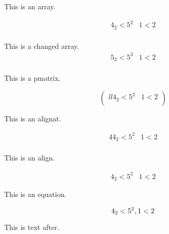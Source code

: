 \documentclass{article}
\begin{document}
This is an array.

\[
\begin{array}{ll}
 4_2  < 5^2 & 1 < 2 \\
\end{array}
\]

This is a changed array.
\[
\begin{array}{ll}
 5_3  < 5^3 & 1 < 2 \\
\end{array}
\]

This is a pmatrix.

\[
\begin{pmatrix}{ll}
 4_2  < 5^2 & 1 < 2 \\
\end{pmatrix}
\]

This is an alignat.

\begin{alignat}{4}
 4_2  < 5^2 & 1 < 2 \\
\end{alignat}

This is an align.


\begin{align}
 4_2  < 5^2 & 1 < 2 
\end{align}

This is an equation.

\begin{equation}
 4_2  < 5^2 , 1 < 2 \\
\end{equation}

This is text after.
\end{document}

